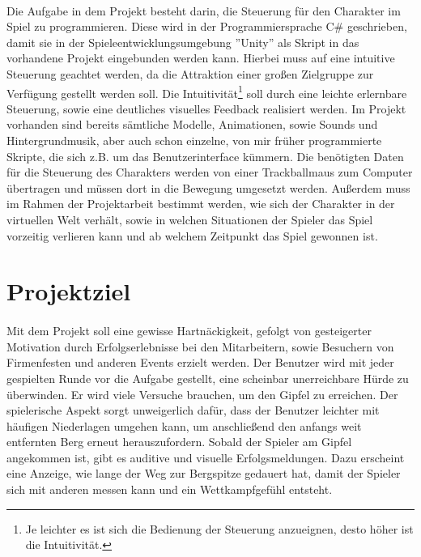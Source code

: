 \paragraph{}
Die Aufgabe in dem Projekt besteht darin, die Steuerung für den Charakter im Spiel zu programmieren. Diese wird in der Programmiersprache C\# geschrieben, damit sie in der Spieleentwicklungsumgebung ”Unity” als Skript in das vorhandene Projekt eingebunden werden kann. Hierbei muss auf eine intuitive Steuerung geachtet werden, da die Attraktion einer großen Zielgruppe zur Verfügung gestellt werden soll. Die Intuitivität\footnote{Je leichter es ist sich die Bedienung der Steuerung anzueignen, desto höher ist die Intuitivität.} soll durch eine leichte erlernbare Steuerung, sowie eine deutliches visuelles Feedback realisiert werden. Im Projekt vorhanden sind bereits sämtliche Modelle, Animationen, sowie Sounds und Hintergrundmusik, aber auch schon einzelne, von mir früher programmierte Skripte, die sich z.B. um das Benutzerinterface kümmern. Die benötigten Daten für die Steuerung des Charakters werden von einer Trackballmaus zum Computer übertragen und müssen dort in die Bewegung umgesetzt werden. Außerdem muss im Rahmen der Projektarbeit bestimmt werden, wie sich der Charakter in der virtuellen Welt verhält, sowie in welchen Situationen der Spieler das Spiel vorzeitig verlieren kann und ab welchem Zeitpunkt das Spiel gewonnen ist.

\section{Projektziel}
\paragraph{}
Mit dem Projekt soll eine gewisse Hartnäckigkeit, gefolgt von gesteigerter Motivation durch Erfolgserlebnisse bei den Mitarbeitern, sowie Besuchern von Firmenfesten und anderen Events erzielt werden. Der Benutzer wird mit jeder gespielten Runde vor die Aufgabe gestellt, eine scheinbar unerreichbare Hürde zu überwinden. Er wird viele Versuche brauchen, um den Gipfel zu erreichen. Der spielerische Aspekt sorgt unweigerlich dafür, dass der Benutzer leichter mit häufigen Niederlagen umgehen kann, um anschließend den anfangs weit entfernten Berg erneut herauszufordern. Sobald der Spieler am Gipfel angekommen ist, gibt es auditive und visuelle Erfolgsmeldungen. Dazu erscheint eine Anzeige, wie lange der Weg zur Bergspitze gedauert hat, damit der Spieler sich mit anderen messen kann und ein Wettkampfgefühl entsteht.

